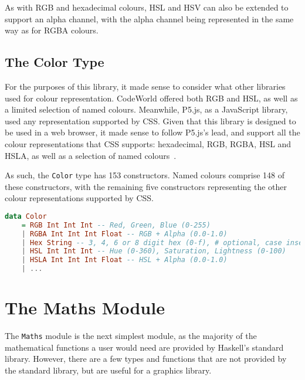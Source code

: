 \documentclass[../main.tex]{subfiles}
\begin{document}
                As with RGB and hexadecimal colours, HSL and HSV can also be extended to
                    support an alpha channel, with the alpha channel being represented in the same
                    way as for RGBA colours.

        \subsection{The Color Type}
            For the purposes of this library, it made sense to consider what other
                libraries used for colour representation.
            CodeWorld offered both RGB and HSL, as well as a limited selection of named
                colours.
            Meanwhile, P5.js, as a JavaScript library, used any representation supported by
                CSS.
            Given that this library is designed to be used in a web browser, it made sense
                to follow P5.js's lead, and support all the colour representations that CSS
                supports: hexadecimal, RGB, RGBA, HSL and HSLA, as well as a selection of named
                colours~\citep{cssColours}.

            As such, the \verb|Color| type has 153 constructors.
            Named colours comprise 148 of these constructors, with the remaining five
                constructors representing the other colour representations supported by CSS.

            \begin{lstlisting}[language=haskell, label={lst:color}, caption={The Color type definition.
                Named colours have been omitted, but are included in the actual implementation, as seen 
                in Appendix~\ref{app:code}.}]
data Color
    = RGB Int Int Int -- Red, Green, Blue (0-255)
    | RGBA Int Int Int Float -- RGB + Alpha (0.0-1.0)
    | Hex String -- 3, 4, 6 or 8 digit hex (0-f), # optional, case insensitive
    | HSL Int Int Int -- Hue (0-360), Saturation, Lightness (0-100)
    | HSLA Int Int Int Float -- HSL + Alpha (0.0-1.0)
    | ...\end{lstlisting}

    \section{The Maths Module}
        The \verb|Maths| module is the next simplest module, as the majority of the
            mathematical functions a user would need are provided by Haskell's standard
            library.
        However, there are a few types and functions that are not provided by the
            standard library, but are useful for a graphics library.
\end{document}
